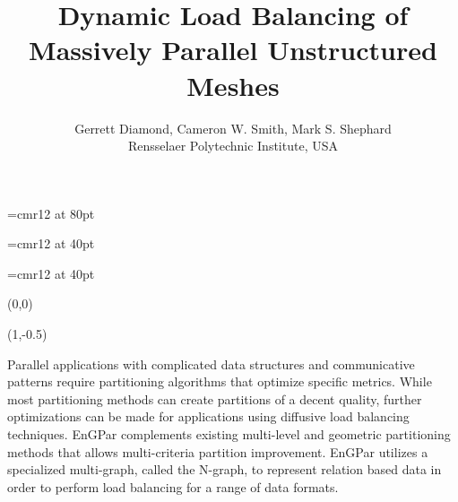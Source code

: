 \documentclass{beamer}
\begin{document}
\font\titlefont=cmr12 at 80pt
\title[Load Balancing of Unstructured Meshes]
{\titlefont
  Dynamic Load Balancing of \\[0.3cm]Massively Parallel Unstructured Meshes
}
\font\authorfont=cmr12 at 40pt
\author[G. Diamond]{\authorfont
  Gerrett Diamond, Cameron W. Smith, Mark S. Shephard\\
  Rensselaer Polytechnic Institute, USA}
\date{}
\font\abstractfont=cmr12 at 40pt
\begin{textblock}{15.8}(0,0)
  \titlepage
  \begin{textblock}{14}(1,-0.5)
    \begin{block}{
      \begin{center}
      \abstractfont
      Parallel applications with complicated data structures and communicative patterns
      require partitioning algorithms that optimize specific metrics. While most
      partitioning methods can create partitions of a decent quality, further
      optimizations can be made for applications using diffusive load balancing techniques.
      EnGPar complements existing multi-level and geometric partitioning methods that allows
      multi-criteria partition improvement. EnGPar utilizes a specialized multi-graph, called
      the N-graph, to represent relation based data in order to perform load balancing for a
      range of data formats.
              
      \end{center}}
    \end{block}
  \end{textblock}
\end{textblock}
\end{document}
